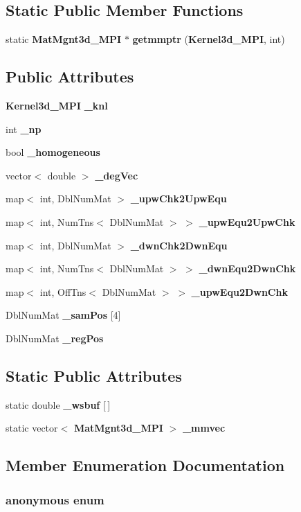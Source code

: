 \subsection*{Static Public Member Functions}
\begin{CompactItemize}
\item 
static {\bf Mat\-Mgnt3d\_\-MPI} $\ast$ {\bf getmmptr} ({\bf Kernel3d\_\-MPI}, int)
\end{CompactItemize}
\subsection*{Public Attributes}
\begin{CompactItemize}
\item 
{\bf Kernel3d\_\-MPI} {\bf \_\-knl}
\item 
int {\bf \_\-np}
\item 
bool {\bf \_\-homogeneous}
\item 
vector$<$ double $>$ {\bf \_\-deg\-Vec}
\item 
map$<$ int, Dbl\-Num\-Mat $>$ {\bf \_\-upw\-Chk2Upw\-Equ}
\item 
map$<$ int, Num\-Tns$<$ Dbl\-Num\-Mat $>$ $>$ {\bf \_\-upw\-Equ2Upw\-Chk}
\item 
map$<$ int, Dbl\-Num\-Mat $>$ {\bf \_\-dwn\-Chk2Dwn\-Equ}
\item 
map$<$ int, Num\-Tns$<$ Dbl\-Num\-Mat $>$ $>$ {\bf \_\-dwn\-Equ2Dwn\-Chk}
\item 
map$<$ int, Off\-Tns$<$ Dbl\-Num\-Mat $>$ $>$ {\bf \_\-upw\-Equ2Dwn\-Chk}
\item 
Dbl\-Num\-Mat {\bf \_\-sam\-Pos} [4]
\item 
Dbl\-Num\-Mat {\bf \_\-reg\-Pos}
\end{CompactItemize}
\subsection*{Static Public Attributes}
\begin{CompactItemize}
\item 
static double {\bf \_\-wsbuf} [$\,$]
\item 
static vector$<$ {\bf Mat\-Mgnt3d\_\-MPI} $>$ {\bf \_\-mmvec}
\end{CompactItemize}


\subsection{Member Enumeration Documentation}
\subsubsection{\setlength{\rightskip}{0pt plus 5cm}anonymous enum}\label{classMatMgnt3d__MPI_dca29a1140aadadfd92b34a02fa516ef_dca29a1140aadadfd92b34a02fa516ef}


